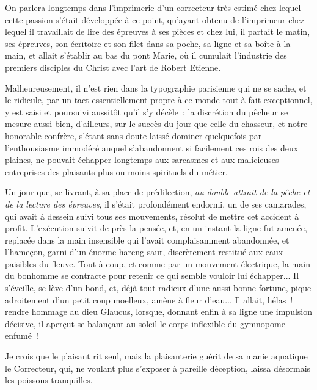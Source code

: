 \documentclass[french,twoside]{book} %
\begin{document}
On parlera longtemps dans l’imprimerie d’un correcteur très estimé chez lequel cette  passion s’était développée à ce point, qu’ayant obtenu de l’imprimeur chez lequel il travaillait de lire des épreuves à ses pièces et chez lui, il partait le matin, ses épreuves, son écritoire et son filet dans sa poche, sa ligne et sa boîte à la main, et allait s’établir au bas du pont Marie, où il cumulait l’industrie des premiers disciples du Christ avec l’art de Robert Etienne.\par
Malheureusement, il n’est rien dans la typographie parisienne qui ne se sache, et le ridicule, par un tact essentiellement propre à ce monde tout-à-fait exceptionnel, y est saisi et poursuivi aussitôt qu’il s’y décèle ; la discrétion du pêcheur se mesure aussi bien, d’ailleurs, sur le succès du jour que celle du chasseur, et notre honorable confrère, s’étant sans doute laissé dominer quelquefois par l’enthousiasme immodéré auquel s’abandonnent si facilement ces rois des deux plaines, ne pouvait échapper longtemps  aux sarcasmes et aux malicieuses entreprises des plaisants plus ou moins spirituels du métier.\par
Un jour que, se livrant, à sa place de prédilection, \emph{au double attrait de la pêche et de la lecture des épreuves}, il s’était profondément endormi, un de ses camarades, qui avait à dessein suivi tous ses mouvements, résolut de mettre cet accident à profit. L’exécution suivit de près la pensée, et, en un instant la ligne fut amenée, replacée dans la main insensible qui l’avait complaisamment abandonnée, et l’hameçon, garni d’un énorme hareng saur, discrètement restitué aux eaux paisibles du fleuve. Tout-à-coup, et comme par un mouvement électrique, la main du bonhomme se contracte pour retenir ce qui semble vouloir lui échapper... Il s’éveille, se lève d’un bond, et, déjà tout radieux d’une aussi bonne fortune, pique adroitement d’un petit coup moelleux,  amène à fleur d’eau... Il allait, hélas ! rendre hommage au dieu Glaucus, lorsque, donnant enfin à sa ligne une impulsion décisive, il aperçut se balançant au soleil le corps inflexible du gymnopome enfumé !\par
Je crois que le plaisant rit seul, mais la plaisanterie guérit de sa manie aquatique le Correcteur, qui, ne voulant plus s’exposer à pareille déception, laissa désormais les poissons tranquilles.\par
\end{document}
